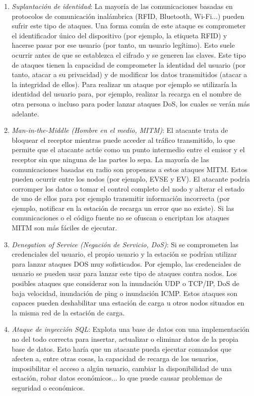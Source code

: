 \documentclass[12pt,a4paper,onecolumn,oneside]{report}
\begin{document}
\begin{enumerate}

\item \textit{Suplantación de identidad}: La mayoría de las comunicaciones basadas en protocolos de comunicación inalámbrica (RFID, Bluetooth, Wi-Fi...) pueden sufrir este tipo de ataques. Una forma común de este ataque es comprometer el identificador único del dispositivo (por ejemplo, la etiqueta RFID) y hacerse pasar por ese usuario (por tanto, un usuario legítimo). Esto suele ocurrir antes de que se establezca el cifrado y se generen las claves. Este tipo de ataques tienen la capacidad de comprometer la identidad del usuario (por tanto, atacar a su privacidad) y de modificar los datos transmitidos (atacar a la integridad de ellos). Para realizar un ataque por ejemplo se utilizaría la identidad del usuario para, por ejemplo, realizar la recarga en el nombre de otra persona o incluso para poder lanzar ataques DoS, los cuales se verán más adelante.

\item \textit{Man-in-the-Middle (Hombre en el medio, MITM)}:  El atacante trata de bloquear el receptor mientras puede acceder al tráfico transmitido, lo que permite que el atacante actúe como un punto intermedio entre el emisor y el receptor sin que ninguna de las partes lo sepa. La mayoría de las comunicaciones basadas en radio son propensas a estos ataques MITM. Estos pueden ocurrir entre los nodos (por ejemplo, EVSE y EV). El atacante podría corromper los datos o tomar el control completo del nodo y alterar el estado de uno de ellos para por ejemplo transmitir información incorrecta (por ejemplo, notificar en la estación de recarga un error que no existe). Si las comunicaciones o el código fuente no se ofuscan o encriptan los ataques MITM son más fáciles de ejecutar.

\item \textit{Denegation of Service (Negación de Servicio, DoS)}: Si se comprometen las credenciales del usuario, el propio usuario y la estación se podrían utilizar para lanzar ataques DOS muy sofisticados. Por ejemplo, las credenciales de usuario se pueden usar para lanzar este tipo de ataques contra nodos. Los posibles ataques que considerar son la inundación UDP o TCP/IP, DoS de baja velocidad, inundación de ping o inundación ICMP. Estos ataques son capaces pueden deshabilitar una estación de carga u otros nodos situados en la misma red de la estación de carga.

\item \textit{Ataque de inyección SQL}: Explota una base de datos con una implementación no del todo correcta para insertar, actualizar o eliminar datos de la propia base de datos. Esto haría que un atacante pueda ejecutar comandos que afecten a, entre otras cosas, la capacidad de recarga de los usuarios, imposibilitar el acceso a algún usuario, cambiar la disponibilidad de una estación, robar datos económicos... lo que puede causar problemas de seguridad o económicos.


\end{enumerate}
\end{document}
